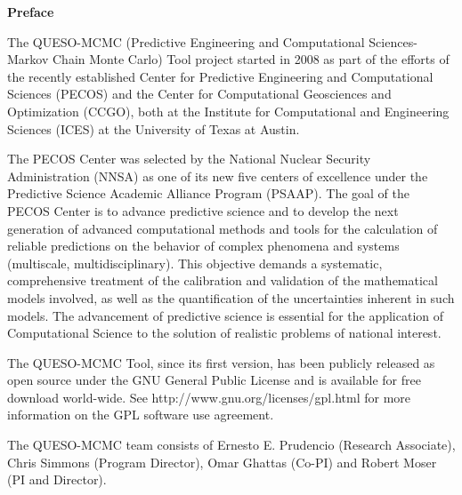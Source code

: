 \clearpage
$~$\\

\clearpage
{\markboth{}{}
}
\tableofcontents


\clearpage
\thispagestyle{empty}
\centerline{\Large\bf Preface}
$~$\\
The QUESO-MCMC (Predictive Engineering and Computational Sciences-Markov Chain Monte Carlo) Tool project started in 2008 as part
of the efforts of the recently established Center for Predictive Engineering and Computational Sciences (PECOS)
and the Center for Computational Geosciences and Optimization (CCGO), both at
the Institute for Computational and Engineering Sciences (ICES) at the University of Texas at Austin.

The PECOS Center was selected by the National Nuclear Security Administration (NNSA) as one of its new five centers of excellence
under the Predictive Science Academic Alliance Program (PSAAP).
The goal of the PECOS Center is
to advance predictive science and to develop the next generation of advanced computational methods and tools
for the calculation of reliable predictions on the behavior of complex phenomena and systems (multiscale, multidisciplinary).
This objective demands a systematic, comprehensive treatment of the calibration and validation of the mathematical models involved,
as well as the quantification of the uncertainties inherent in such models.
The advancement of predictive science is essential for the application of Computational Science to the solution of realistic problems of national interest.

The QUESO-MCMC Tool, since its first version, has been publicly released as open source
under the GNU General Public License and is available for free download world-wide.
See http://www.gnu.org/licenses/gpl.html for more information on the GPL software use agreement.

The QUESO-MCMC team consists of
Ernesto E. Prudencio (Research Associate),
Chris Simmons (Program Director),
Omar Ghattas (Co-PI) and
Robert Moser (PI and Director).

